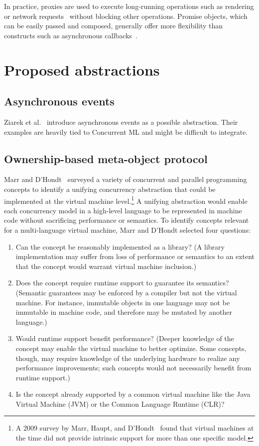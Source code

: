 \documentclass{sig-alternate}
\begin{document}
In practice, proxies are used to execute long-running operations such as rendering or network requests~\cite{Swalens2014} without blocking other operations. Promise objects, which can be easily passed and composed, generally offer more flexibility than constructs such as asynchronous callbacks~\cite{Kambona2013}.

\section{Proposed abstractions}

\subsection{Asynchronous events}

Ziarek et al.~\cite{Ziarek2011} introduce asynchronous events as a possible abstraction. Their examples are heavily tied to Concurrent ML and might be difficult to integrate.

\subsection{Ownership-based meta-object protocol}

Marr and D'Hondt~\cite{Marr2012} surveyed a variety of concurrent and parallel programming concepts to identify a unifying concurrency abstraction that could be implemented at the virtual machine level.\footnote{A 2009 survey by Marr, Haupt, and D'Hondt~\cite{Marr2009} found that virtual machines at the time did not provide intrinsic support for more than one specific model.} A unifying abstraction would enable each concurrency model in a high-level language to be represented in machine code without sacrificing performance or semantics. To identify concepts relevant for a multi-language virtual machine, Marr and D'Hondt selected four questions:

\begin{enumerate}
  \item Can the concept be reasonably implemented as a library? (A library implementation may suffer from loss of performance or semantics to an extent that the concept would warrant virtual machine inclusion.)

  \item Does the concept require runtime support to guarantee its semantics? (Semantic guarantees may be enforced by a compiler but not the virtual machine. For instance, immutable objects in one language may not be immutable in machine code, and therefore may be mutated by another language.)

  \item Would runtime support benefit performance? (Deeper knowledge of the concept may enable the virtual machine to better optimize. Some concepts, though, may require knowledge of the underlying hardware to realize any performance improvements; such concepts would not necessarily benefit from runtime support.)

  \item Is the concept already supported by a common virtual machine like the Java Virtual Machine (JVM) or the Common Language Runtime (CLR)?
\end{enumerate}
\end{document}
